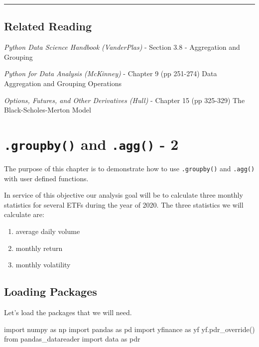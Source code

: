 \documentclass[
  letterpaper,
  DIV=11,
  numbers=noendperiod]{scrreprt}
\newenvironment{Shaded}{\begin{snugshade}}{\end{snugshade}}
\newcommand{\ImportTok}[1]{\textcolor[rgb]{0.00,0.46,0.62}{#1}}
\newcommand{\NormalTok}[1]{\textcolor[rgb]{0.00,0.23,0.31}{#1}}
\begin{document}
\begin{center}\rule{0.5\linewidth}{0.5pt}\end{center}

\hypertarget{related-reading-5}{%
\section{Related Reading}\label{related-reading-5}}

\emph{Python Data Science Handbook (VanderPlas)} - Section 3.8 -
Aggregation and Grouping

\emph{Python for Data Analysis (McKinney)} - Chapter 9 (pp 251-274) Data
Aggregation and Grouping Operations

\emph{Options, Futures, and Other Derivatives (Hull)} - Chapter 15 (pp
325-329) The Black-Scholes-Merton Model

\hypertarget{groupby-and-.agg---2}{%
\chapter{\texorpdfstring{\texttt{.groupby()} and \texttt{.agg()} -
2}{.groupby() and .agg() - 2}}\label{groupby-and-.agg---2}}

The purpose of this chapter is to demonstrate how to use
\texttt{.groupby()} and \texttt{.agg()} with user defined functions.

In service of this objective our analysis goal will be to calculate
three monthly statistics for several ETFs during the year of 2020. The
three statistics we will calculate are:

\begin{enumerate}
\def\labelenumi{\arabic{enumi}.}
\item
  average daily volume
\item
  monthly return
\item
  monthly volatility
\end{enumerate}

\hypertarget{loading-packages-3}{%
\section{Loading Packages}\label{loading-packages-3}}

Let's load the packages that we will need.

\begin{Shaded}
\begin{Highlighting}[]
\ImportTok{import}\NormalTok{ numpy }\ImportTok{as}\NormalTok{ np}
\ImportTok{import}\NormalTok{ pandas }\ImportTok{as}\NormalTok{ pd}
\ImportTok{import}\NormalTok{ yfinance }\ImportTok{as}\NormalTok{ yf}
\NormalTok{yf.pdr\_override()}
\ImportTok{from}\NormalTok{ pandas\_datareader }\ImportTok{import}\NormalTok{ data }\ImportTok{as}\NormalTok{ pdr}
\end{Highlighting}
\end{Shaded}
\end{document}
